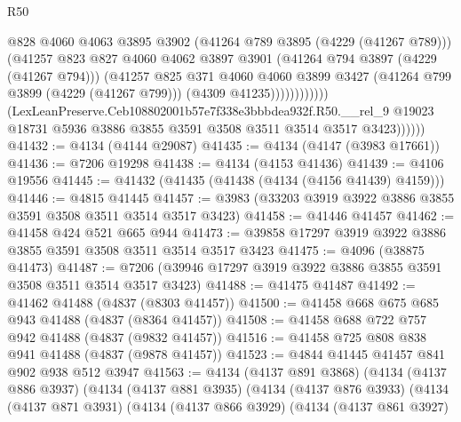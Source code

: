 \begin{lexlean}{R50}
\begin{coremodule}
                                @828
                                @4060
                                @4063
                                @3895
                                @3902
                                (@41264 @789 @3895 (@4229 (@41267 @789)))
                                (@41257
                                  @823
                                  @827
                                  @4060
                                  @4062
                                  @3897
                                  @3901
                                  (@41264 @794 @3897 (@4229 (@41267 @794)))
                                  (@41257
                                    @825
                                    @371
                                    @4060
                                    @4060
                                    @3899
                                    @3427
                                    (@41264 @799 @3899 (@4229 (@41267 @799)))
                                    (@4309 @41235))))))))))))
              (LexLeanPreserve.Ceb108802001b57e7f338e3bbbdea932f.R50.__rel_9
                @19023
                @18731
                @5936
                @3886
                @3855
                @3591
                @3508
                @3511
                @3514
                @3517
                @3423))))))
@41432 := @4134 (@4144 @29087)
@41435 := @4134 (@4147 (@3983 @17661))
@41436 := @7206 @19298
@41438 := @4134 (@4153 @41436)
@41439 := @4106 @19556
@41445 := @41432 (@41435 (@41438 (@4134 (@4156 @41439) @4159)))
@41446 := @4815 @41445
@41457 := @3983 (@33203 @3919 @3922 @3886 @3855 @3591 @3508 @3511 @3514 @3517 @3423)
@41458 := @41446 @41457
@41462 := @41458 @424 @521 @665 @944
@41473 := @39858 @17297 @3919 @3922 @3886 @3855 @3591 @3508 @3511 @3514 @3517 @3423
@41475 := @4096 (@38875 @41473)
@41487 := @7206 (@39946 @17297 @3919 @3922 @3886 @3855 @3591 @3508 @3511 @3514 @3517 @3423)
@41488 := @41475 @41487
@41492 := @41462 @41488 (@4837 (@8303 @41457))
@41500 := @41458 @668 @675 @685 @943 @41488 (@4837 (@8364 @41457))
@41508 := @41458 @688 @722 @757 @942 @41488 (@4837 (@9832 @41457))
@41516 := @41458 @725 @808 @838 @941 @41488 (@4837 (@9878 @41457))
@41523 := @4844 @41445 @41457 @841 @902 @938 @512 @3947
@41563 := @4134
    (@4137 @891 @3868)
    (@4134
      (@4137 @886 @3937)
      (@4134
        (@4137 @881 @3935)
        (@4134
          (@4137 @876 @3933)
          (@4134
            (@4137 @871 @3931)
            (@4134
              (@4137 @866 @3929)
              (@4134
                (@4137 @861 @3927)

\end{coremodule}
\end{lexlean}

